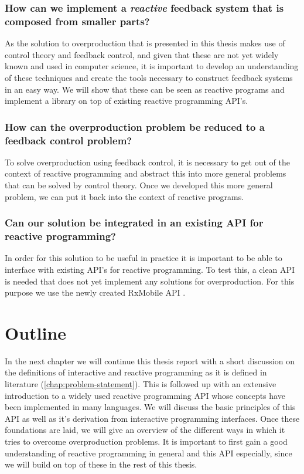\subsubsection*{How can we implement a \emph{reactive} feedback system that is composed from smaller parts?} 
As the solution to overproduction that is presented in this thesis makes use of control theory and feedback control, and given that these are not yet widely known and used in computer science, it is important to develop an understanding of these techniques and create the tools necessary to construct feedback systems in an easy way. We will show that these can be seen as reactive programs and implement a library on top of existing reactive programming API's.

\subsubsection*{How can the overproduction problem be reduced to a feedback control problem?}
To solve overproduction using feedback control, it is necessary to get out of the context of reactive programming and abstract this into more general problems that can be solved by control theory. Once we developed this more general problem, we can put it back into the context of reactive programs.

\subsubsection*{Can our solution be integrated in an existing API for reactive programming?}
In order for this solution to be useful in practice it is important to be able to interface with existing API's for reactive programming. To test this, a clean API is needed that does not yet implement any solutions for overproduction. For this purpose we use the newly created RxMobile API \cite{RxMobile}.

\section*{Outline}
In the next chapter we will continue this thesis report with a short discussion on the definitions of interactive and reactive programming as it is defined in literature (\autoref{chap:problem-statement}). This is followed up with an extensive introduction to a widely used reactive programming API whose concepts have been implemented in many languages. We will discuss the basic principles of this API as well as it's derivation from interactive programming interfaces. Once these foundations are laid, we will give an overview of the different ways in which it tries to overcome overproduction problems. It is important to first gain a good understanding of reactive programming in general and this API especially, since we will build on top of these in the rest of this thesis.

